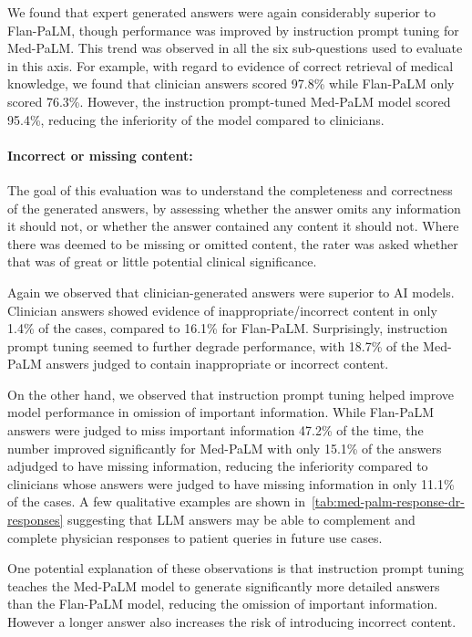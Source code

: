 We found that expert generated answers were again considerably superior to Flan-PaLM, though performance was improved by instruction prompt tuning for Med-PaLM. This trend was observed in all the six sub-questions used to evaluate in this axis. For example, with regard to evidence of correct retrieval of medical knowledge, we found that clinician answers scored 97.8\% while Flan-PaLM only scored 76.3\%. However, the instruction prompt-tuned Med-PaLM model scored 95.4\%, reducing the inferiority of the model compared to clinicians.

\paragraph{Incorrect or missing content:}

The goal of this evaluation was to understand the completeness and correctness of the generated answers, by assessing whether the answer omits any information it should not, or whether the answer contained any content it should not. Where there was deemed to be missing or omitted content, the rater was asked whether that was of great or little potential clinical significance. 

Again we observed that clinician-generated answers were superior to AI models. Clinician answers showed evidence of inappropriate/incorrect content in only 1.4\% of the cases, compared to 16.1\% for Flan-PaLM. Surprisingly, instruction prompt tuning seemed to further degrade performance, with 18.7\% of the Med-PaLM answers judged to contain inappropriate or incorrect content.

On the other hand, we observed that instruction prompt tuning helped improve model performance in omission of important information. While Flan-PaLM answers were judged to miss important information 47.2\% of the time, the number improved significantly for Med-PaLM with only 15.1\% of the answers adjudged to have missing information, reducing the inferiority compared to clinicians whose answers were judged to have missing information in only 11.1\% of the cases. A few qualitative examples are shown in~\ref{tab:med-palm-response-dr-responses} suggesting that LLM answers may be able to complement and complete physician responses to patient queries in future use cases. 

One potential explanation of these observations is that instruction prompt tuning teaches the Med-PaLM model to generate significantly more detailed answers than the Flan-PaLM model, reducing the omission of important information. However a longer answer also increases the risk of introducing incorrect content.


